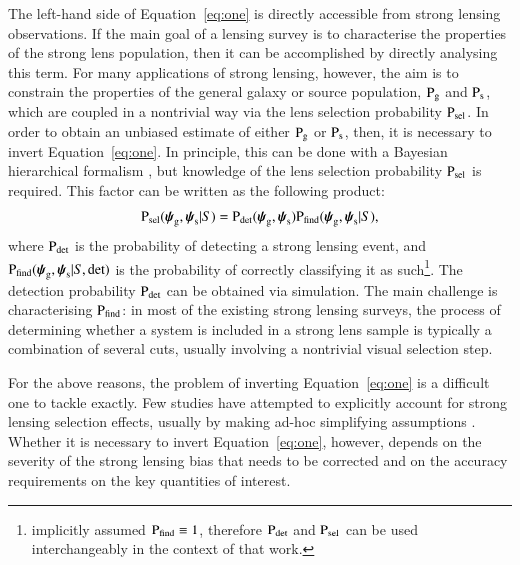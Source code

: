 \documentclass{aa}
\def\psilens{\boldsymbol{\psi}_\mathrm{g}}
\def\psisource{\boldsymbol{\psi}_\mathrm{s}}
\def\prlens{{\rm P}_\mathrm{g}}
\def\prsource{{\rm P}_\mathrm{s}}
\def\pdet{{\rm P}_\mathrm{det}}
\def\psel{{\rm P}_\mathrm{sel}}
\def\pfind{{\rm P}_\mathrm{find}}
\def\Eref#1{Equation~\ref{#1}\xspace}
\begin{document}
The left-hand side of \Eref{eq:one} is directly accessible from strong lensing observations. If the main goal of a lensing survey is to characterise the properties of the strong lens population, then it can be accomplished by directly analysing this term. For many applications of strong lensing, however, the aim is to constrain the properties of the general galaxy or source population, $\prlens$ and $\prsource$, which are coupled in a nontrivial way via the lens selection probability $\psel$.
In order to obtain an unbiased estimate of either $\prlens$ or $\prsource$, then, it is necessary to invert \Eref{eq:one}.
In principle, this can be done with a Bayesian hierarchical formalism \citep{Son22}, but knowledge of the lens selection probability $\psel$ is required.
This factor can be written as the following product:
\begin{equation}\label{eq:two}
\psel(\psilens,\psisource|S) = \pdet(\psilens,\psisource)\pfind(\psilens,\psisource|S),
\end{equation}
where $\pdet$ is the probability of detecting a strong lensing event, and $\pfind(\psilens,\psisource|S,\mathrm{det})$ is the probability of correctly classifying it as such\footnote{\citet{Son22} implicitly assumed $\pfind\equiv1$, therefore $\pdet$ and $\psel$ can be used interchangeably in the context of that work.}.
The detection probability $\pdet$ can be obtained via simulation. The main challenge is characterising $\pfind$: in most of the existing strong lensing surveys, the process of determining whether a system is included in a strong lens sample is typically a combination of several cuts, usually involving a nontrivial visual selection step.

For the above reasons, the problem of inverting \Eref{eq:one} is a difficult one to tackle exactly.
Few studies have attempted to explicitly account for strong lensing selection effects, usually by making ad-hoc simplifying assumptions \citep{Son++15,O+A17,Son++19}.
Whether it is necessary to invert \Eref{eq:one}, however, depends on the severity of the strong lensing bias that needs to be corrected and on the accuracy requirements on the key quantities of interest.
\end{document}

